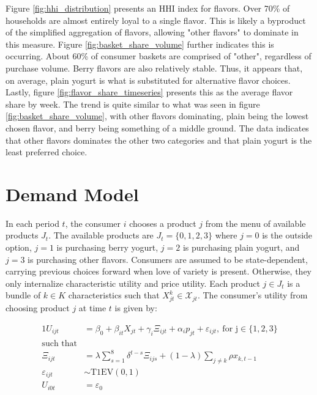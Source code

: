 \documentclass[11pt]{article}
\theoremstyle{definition}
\theoremstyle{remark}
\begin{document}
    Figure \ref{fig:hhi_distribution} presents an HHI index for flavors. Over 70\% of households are almost entirely loyal to a single flavor. This is likely a byproduct of the simplified aggregation of flavors, allowing "other flavors" to dominate in this measure. Figure \ref{fig:basket_share_volume} further indicates this is occurring. About 60\% of consumer baskets are comprised of "other", regardless of purchase volume. Berry flavors are also relatively stable. Thus, it appears that, on average, plain yogurt is what is substituted for alternative flavor choices. Lastly, figure \ref{fig:flavor_share_timeseries} presents this as the average flavor share by week. The trend is quite similar to what was seen in figure \ref{fig:basket_share_volume}, with other flavors dominating, plain being the lowest chosen flavor, and berry being something of a middle ground. The data indicates that other flavors dominates the other two categories and that plain yogurt is the least preferred choice.

\section{Demand Model}
    In each period $t$, the consumer $i$ chooses a product $j$ from the menu of available products $J_t$. The available products are $J_t = \{0,1,2,3\}$ where $j=0$ is the outside option, $j=1$ is purchasing berry yogurt, $j=2$ is purchasing plain yogurt, and $j=3$ is purchasing other flavors. Consumers are assumed to be state-dependent, carrying previous choices forward when love of variety is present. Otherwise, they only internalize characteristic utility and price utility. Each product $j\in J_t$ is a bundle of $k\in K$ characteristics such that $X_{jt}^k \in \mathcal{X}_{jt}$. The consumer's utility from choosing product $j$ at time $t$ is given by:


    \begin{alignat*}{1}
      U_{ijt} &= \beta_0 + \beta_{it}X_{jt}
                  + \gamma_i\Xi_{ijt} + \alpha_i p_{jt} +  \varepsilon_{ijt}, \ \text{for j$\in\{1,2,3\}$} \\
    \text{such that} \\
      \Xi_{ijt} &= \lambda\sum_{s=1}^{8}\delta^{t-s}\Xi_{ijs} + (1-\lambda)\sum_{j\ne k}\rho x_{k,t-1} \\
      \varepsilon_{ijt} &\sim \text{T1EV}(0,1) \\
      \text{$U_{i0t}$}&=\varepsilon_0 
    \end{alignat*}
\end{document}
